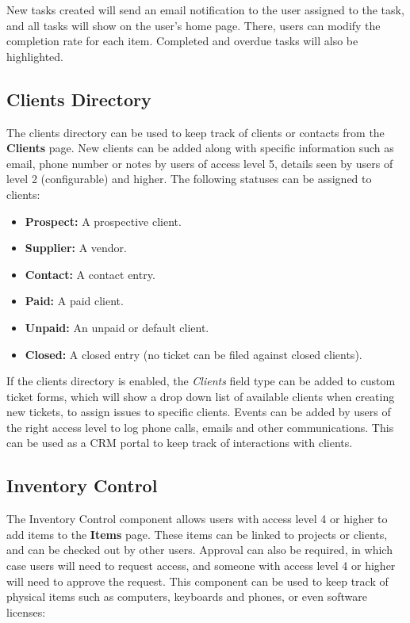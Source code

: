 \documentclass[11pt]{article}
\begin{document}
New tasks created will send an email notification to the user assigned to the task, and all tasks will show on the user's home page. There, users can modify the completion rate for each item. Completed and overdue tasks will also be highlighted.

\subsection{Clients Directory}
The clients directory can be used to keep track of clients or contacts from the \textbf{Clients} page. New clients can be added along with specific information such as email, phone number or notes by users of access level 5, details seen by users of level 2 (configurable) and higher. The following statuses can be assigned to clients:

\begin{itemize}
\item \textbf{Prospect:} A prospective client.
\item \textbf{Supplier:} A vendor.
\item \textbf{Contact:} A contact entry.
\item \textbf{Paid:} A paid client.
\item \textbf{Unpaid:} An unpaid or default client.
\item \textbf{Closed:} A closed entry (no ticket can be filed against closed clients).
\end{itemize}

If the clients directory is enabled, the \textit{Clients} field type can be added to custom ticket forms, which will show a drop down list of available clients when creating new tickets, to assign issues to specific clients. Events can be added by users of the right access level to log phone calls, emails and other communications. This can be used as a CRM portal to keep track of interactions with clients. 

\subsection{Inventory Control}
The Inventory Control component allows users with access level 4 or higher to add items to the \textbf{Items} page. These items can be linked to projects or clients, and can be checked out by other users. Approval can also be required, in which case users will need to request access, and someone with access level 4 or higher will need to approve the request. This component can be used to keep track of physical items such as computers, keyboards and phones, or even software licenses:
\end{document}
